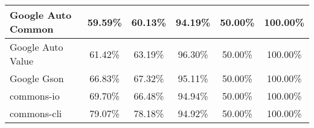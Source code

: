\documentclass[../main]{subfiles}
\begin{document}
\begin{table}[!htb]
\begin{tabular}{|l|c|c|c|c|c|}
Google Auto Common            & 59.59\%                                                                                 & 60.13\%                                                                                     & 94.19\%                                                                              & 50.00\%                                                                               & 100.00\%                                                                             \\ \hline
Google Auto Value             & 61.42\%                                                                                 & 63.19\%                                                                                     & 96.30\%                                                                              & 50.00\%                                                                               & 100.00\%                                                                             \\ \hline
Google Gson                   & 66.83\%                                                                                 & 67.32\%                                                                                     & 95.11\%                                                                              & 50.00\%                                                                               & 100.00\%                                                                             \\ \hline
commons-io                    & 69.70\%                                                                                 & 66.48\%                                                                                     & 94.94\%                                                                              & 50.00\%                                                                               & 100.00\%                                                                             \\ \hline
commons-cli                   & 79.07\%                                                                                 & 78.18\%                                                                                     & 94.92\%                                                                              & 50.00\%                                                                               & 100.00\%                                                                             \\ \hline

\end{tabular}
\end{table}
\end{document}
